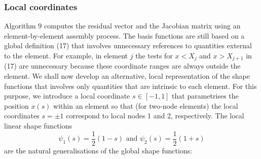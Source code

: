 \hypertarget{index_local_coords}{}\subsubsection{Local coordinates}\label{index_local_coords}
Algorithm 9 computes the residual vector and the Jacobian matrix using an element-\/by-\/element assembly process. The basis functions are still based on a global definition (17) that involves unnecessary references to quantities external to the element. For example, in element $ j $ the tests for $ x < X_j$ and $ x > X_{j+1}$ in (17) are unnecessary because these coordinate ranges are always outside the element. We shall now develop an alternative, local representation of the shape functions that involves only quantities that are intrinsic to each element. For this purpose, we introduce a local coordinate $s \in [-1,1] $ that parametrises the position $ x(s) $ within an element so that (for two-\/node elements) the local coordinates $s=\pm 1$ correspond to local nodes 1 and 2, respectively. The local linear shape functions \[ \psi_1(s) = \frac{1}{2}(1-s) \mbox{\ \ \ and \ \ \ } \psi_2(s) = \frac{1}{2}(1+s)\] are the natural generalisations of the global shape functions\+:
